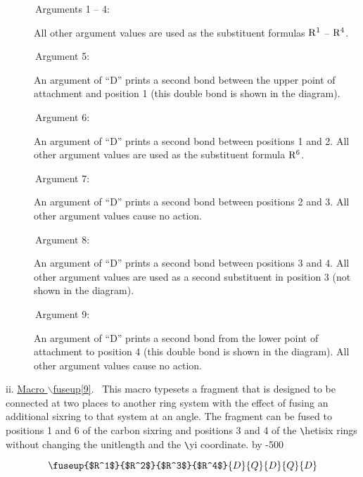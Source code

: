  \reinit
 \begin{description}
 \item[{\rm \ \ \ \ \ \ Arguments 1 -- 4:}]  \rhq  All other argument
 values are used as the substituent formulas ${\rm R^1}$ --
 ${\rm R^4}$.
 \item[{\rm \ \ \ \ \ \ Argument 5:}]  An argument of ``D''
      prints a second bond between the upper point of 
      attachment and position 1 (this double bond is shown
      in the diagram). \ri
 \item[{\rm \ \ \ \ \ \ Argument 6:}] \rhq  An argument of ``D'' prints
      a second bond between positions 1 and 2. All other argument
      values are used as the substituent formula ${\rm R^6}$.
 \item[{\rm \ \ \ \ \ \ Argument 7:}]  An argument of ``D''
      prints a second bond between positions 2 and 3. All other
      argument values cause no action.
 \item[{\rm \ \ \ \ \ \ Argument 8:}] \rhq  An argument of ``D'' prints
      a second bond between positions 3 and 4.  All other 
      argument values are used as a second substituent in
      position 3 (not shown in the diagram).
 \item[{\rm \ \ \ \ \ \ Argument 9:}] An argument of ``D'' prints
      a second bond from the lower point of attachment to
      position 4 (this double bond is shown in the diagram).
      All other argument values cause no action.
 \end{description}
 \newpage
 \indent ii. \underline{Macro $\backslash $fuseup[9]}.
 \ This macro typesets a fragment that is designed to be
 connected at two places to another ring system with the
 effect of fusing an additional sixring to that system
 at an angle. The fragment can be fused to positions 
 1 and 6 of the carbon sixring and positions 3 and 4 of
 the \verb+\+hetisix rings without changing the unitlength
 and the \verb+\+yi coordinate.
 \advance \yi by -500 

 \[ \fuseup{$R^1$}{$R^2$}{$R^3$}{$R^4$}{D}{Q}{D}{Q}{D} \]

